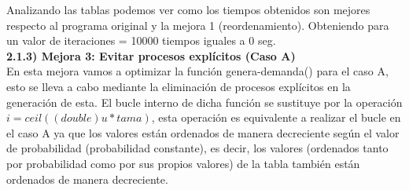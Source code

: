 \documentclass{article}
\begin{document}
	Analizando las tablas podemos ver como los tiempos obtenidos son mejores respecto al programa original y la mejora 1 (reordenamiento). Obteniendo para un valor de iteraciones = 10000 tiempos iguales a 0 seg. \\

	
	\normalsize{\textbf{2.1.3) Mejora 3: Evitar procesos explícitos (Caso A)}} \\
	
	En esta mejora vamos a optimizar la función genera-demanda() para el caso A, esto se lleva a cabo mediante la eliminación de procesos explícitos en la generación de esta. El bucle interno de dicha función se sustituye por la operación $i = ceil((double)u*tama)$, esta operación es equivalente a realizar el bucle en el caso A ya que los valores están ordenados de manera decreciente según el valor de probabilidad (probabilidad constante), es decir, los valores (ordenados tanto por probabilidad como por sus propios valores) de la tabla también están ordenados de manera decreciente.
\end{document}
